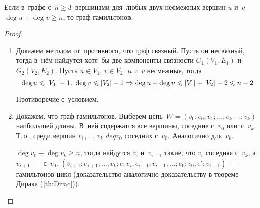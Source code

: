 \begin{theorem}[Оре]
	Если в~графе с~$n \geqslant 3$~вершинами для~любых двух несмежных вершин $u$ и~$v$ $\deg u + \deg v \geqslant n$, то граф гамильтонов.
\end{theorem}
\begin{proof}
\begin{enumerate}
	\item Докажем методом от~противного, что граф связный.
	Пусть он несвязный, тогда в~нём найдутся хотя~бы две компоненты связности $G_1(V_1, E_1)$ и~$G_2(V_2, E_2)$.
	Пусть $u \in V_1$, $v \in V_2$. $u$ и~$v$ несмежные, тогда
	\begin{equation*}
	\deg u \leqslant |V_1| - 1, \ \deg v \leqslant |V_2| - 1 \opbr\Rightarrow \deg u + \deg v \opbr\leqslant |V_1| + |V_2| - 2 \opbr\leqslant n - 2
	\end{equation*}
	
	Противоречие с~условием.
	
	\item Докажем, что граф гамильтонов.
	Выберем цепь~$W = (v_0; e_0; v_1; \ldots; e_{k-1}; v_k)$ наибольшей длины.
	В~ней содержатся все вершины, соседние с~$v_0$ или~с~$v_k$.
	Т.\,о., среди вершин $v_1, \ldots, v_k$ $deg v_0$ соседних с~$v_0$.
	Аналогично для~$v_k$.
	
	$\deg v_0 + \deg v_k \geqslant n$, тогда найдутся $v_i$ и~$v_{i+1}$ такие, что $v_i$ соседняя с~$v_k$, а $v_{i+1}$~--- с~$v_0$.\newline
	$(v_{i+1}; e_{i+1}; \ldots; v_k; e; v_i; e_{i-1}; v_{i-1}; \ldots; e_0; v_0; e'; v_{i+1})$~--- гамильтонов цикл (доказательство аналогично доказательству в теореме Дирака (\ref{th:Dirac})).
\end{enumerate}
\end{proof}